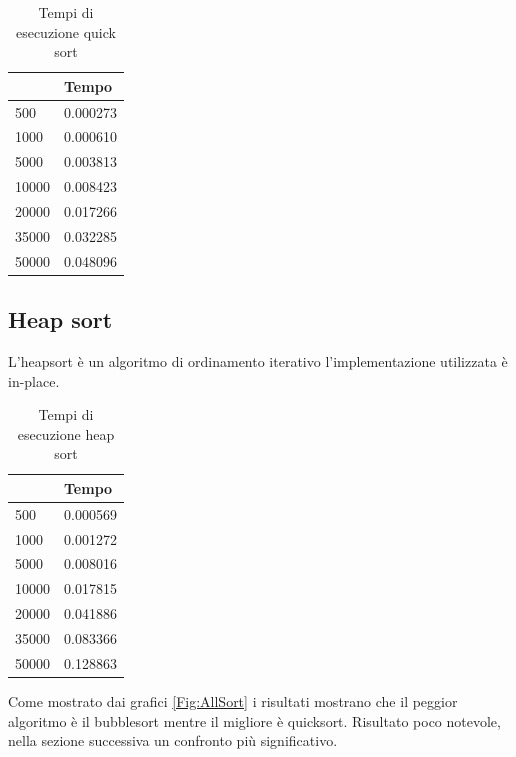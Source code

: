\documentclass[12pt,a4paper]{report}
\begin{document}
\begin{table}[h]
\centering
\begin{tabular}{| l | l  |}
\hline
            & Tempo \\ \hline
500   & 0.000273      \\ \hline
1000  & 0.000610      \\ \hline
5000  & 0.003813     \\ \hline
10000 & 0.008423      \\ \hline
20000 & 0.017266     \\ \hline
35000 & 0.032285     \\ \hline
50000 & 0.048096    \\ \hline

\end{tabular}
\caption{Tempi di esecuzione quick sort}
\label{Tab:Tempi esecuzione QuickSort}
\end{table}

\subsection{Heap sort}
L'heapsort è un algoritmo di ordinamento iterativo l'implementazione utilizzata è in-place.

	

\begin{table}[h]
\centering
\begin{tabular}{| l | l  |}
\hline
            & Tempo \\ \hline
500   & 0.000569      \\ \hline
1000  & 0.001272      \\ \hline
5000  & 0.008016     \\ \hline
10000 & 0.017815      \\ \hline
20000 & 0.041886     \\ \hline
35000 & 0.083366     \\ \hline
50000 & 0.128863    \\ \hline

\end{tabular}
\caption{Tempi di esecuzione heap sort}
\label{Tab:Tempi esecuzione HeapSort}
\end{table}

Come mostrato dai grafici \ref{Fig:AllSort} i risultati mostrano che il peggior algoritmo è il bubblesort mentre il migliore è quicksort.  Risultato poco notevole, nella sezione successiva un confronto più significativo.
\end{document}
